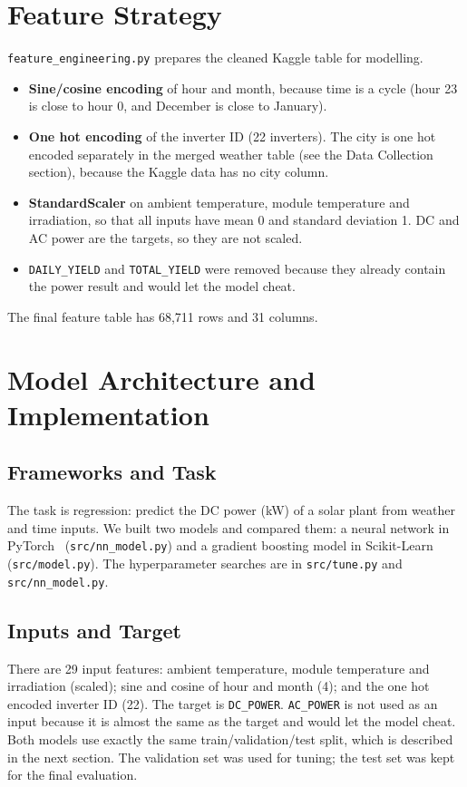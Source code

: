 \documentclass[11pt,a4paper]{article}
\begin{document}
\section{Feature Strategy}
\texttt{feature\_engineering.py} prepares the cleaned Kaggle table for
modelling.
\begin{itemize}
  \item \textbf{Sine/cosine encoding} of hour and month, because time is a
        cycle (hour 23 is close to hour 0, and December is close to January).
  \item \textbf{One hot encoding} of the inverter ID (22 inverters).
        The city is one hot encoded separately in the merged weather table
        (see the Data Collection section), because the Kaggle data has no
        city column.
  \item \textbf{StandardScaler} on ambient temperature, module temperature
        and irradiation, so that all inputs have mean 0 and standard
        deviation 1. DC and AC power are the targets, so they are not scaled.
  \item \texttt{DAILY\_YIELD} and \texttt{TOTAL\_YIELD} were removed because
        they already contain the power result and would let the model cheat.
\end{itemize}
The final feature table has 68,711 rows and 31 columns.



\section{Model Architecture and Implementation}

\subsection{Frameworks and Task}
The task is regression: predict the DC power (kW) of a solar plant from
weather and time inputs. We built two models and compared them: a neural
network in PyTorch~\cite{pytorch} (\texttt{src/nn\_model.py}) and a gradient
boosting model in Scikit-Learn~\cite{scikit-learn} (\texttt{src/model.py}).
The hyperparameter searches are in \texttt{src/tune.py} and
\texttt{src/nn\_model.py}.

\subsection{Inputs and Target}
There are 29 input features: ambient temperature, module temperature and
irradiation (scaled); sine and cosine of hour and month (4); and the one hot
encoded inverter ID (22). The target is \texttt{DC\_POWER}.
\texttt{AC\_POWER} is not used as an input because it is almost the same as
the target and would let the model cheat. Both models use exactly the same
train/validation/test split, which is described in the next section. The
validation set was used for tuning; the test set was kept for the final
evaluation.
\end{document}
